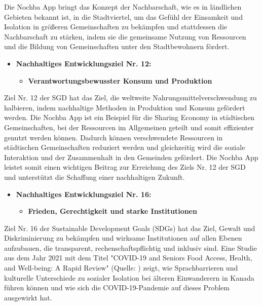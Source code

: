Die Nochba App bringt das Konzept der Nachbarschaft, wie es in ländlichen Gebieten bekannt ist, in die Stadtviertel, um das Gefühl der Einsamkeit und Isolation in größeren Gemeinschaften zu bekämpfen und stattdessen die Nachbarschaft zu stärken, indem sie die gemeinsame Nutzung von Ressourcen und die Bildung von Gemeinschaften unter den Stadtbewohnern fördert.

\begin{itemize}
    \item \textbf{Nachhaltiges Entwicklungsziel Nr. 12:}
          \begin{itemize}
              \item \textbf{Verantwortungsbewusster Konsum und Produktion}
          \end{itemize}
\end{itemize}

Ziel Nr. 12 der SGD hat das Ziel, die weltweite Nahrungsmittelverschwendung zu halbieren, indem nachhaltige Methoden in Produktion und Konsum gefördert werden. Die Nochba App ist ein Beispiel für die Sharing Economy in städtischen Gemeinschaften, bei der Ressourcen im Allgemeinen geteilt und somit effizienter genutzt werden können. Dadurch können verschwendete Ressourcen in städtischen Gemeinschaften reduziert werden und gleichzeitig wird die soziale Interaktion und der Zusammenhalt in den Gemeinden gefördert. Die Nochba App leistet somit einen wichtigen Beitrag zur Erreichung des Ziels Nr. 12 der SGD und unterstützt die Schaffung einer nachhaltigen Zukunft.

\begin{itemize}
    \item \textbf{Nachhaltiges Entwicklungsziel Nr. 16: }
          \begin{itemize}
              \item \textbf{Frieden, Gerechtigkeit und starke Institutionen}
          \end{itemize}
\end{itemize}

Ziel Nr. 16 der Sustainable Development Goals (SDGs) hat das Ziel, Gewalt und Diskriminierung zu bekämpfen und wirksame Institutionen auf allen Ebenen aufzubauen, die transparent, rechenschaftspflichtig und inklusiv sind. Eine Studie aus dem Jahr 2021 mit dem Titel "COVID-19 and Seniors Food Access, Health, and Well-being: A Rapid Review" (Quelle: \cite{challenges-for-immigrant-seniors}) zeigt, wie Sprachbarrieren und kulturelle Unterschiede zu sozialer Isolation bei älteren Einwanderern in Kanada führen können und wie sich die COVID-19-Pandemie auf dieses Problem ausgewirkt hat.

